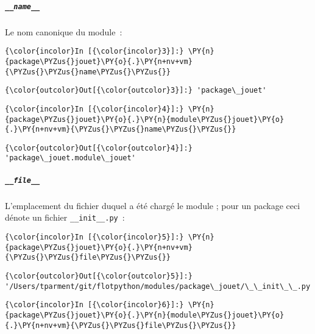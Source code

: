     \hypertarget{name__}{%
\subparagraph{\texorpdfstring{\texttt{\_\_name\_\_}}{\_\_name\_\_}}\label{name__}}

    Le nom canonique du module~:

    \begin{Verbatim}[commandchars=\\\{\}]
{\color{incolor}In [{\color{incolor}3}]:} \PY{n}{package\PYZus{}jouet}\PY{o}{.}\PY{n+nv+vm}{\PYZus{}\PYZus{}name\PYZus{}\PYZus{}}
\end{Verbatim}


\begin{Verbatim}[commandchars=\\\{\}]
{\color{outcolor}Out[{\color{outcolor}3}]:} 'package\_jouet'
\end{Verbatim}
            
    \begin{Verbatim}[commandchars=\\\{\}]
{\color{incolor}In [{\color{incolor}4}]:} \PY{n}{package\PYZus{}jouet}\PY{o}{.}\PY{n}{module\PYZus{}jouet}\PY{o}{.}\PY{n+nv+vm}{\PYZus{}\PYZus{}name\PYZus{}\PYZus{}}
\end{Verbatim}


\begin{Verbatim}[commandchars=\\\{\}]
{\color{outcolor}Out[{\color{outcolor}4}]:} 'package\_jouet.module\_jouet'
\end{Verbatim}
            
    \hypertarget{file__}{%
\subparagraph{\texorpdfstring{\texttt{\_\_file\_\_}}{\_\_file\_\_}}\label{file__}}

    L'emplacement du fichier duquel a été chargé le module ; pour un package
ceci dénote un fichier \texttt{\_\_init\_\_.py}~:

    \begin{Verbatim}[commandchars=\\\{\}]
{\color{incolor}In [{\color{incolor}5}]:} \PY{n}{package\PYZus{}jouet}\PY{o}{.}\PY{n+nv+vm}{\PYZus{}\PYZus{}file\PYZus{}\PYZus{}}
\end{Verbatim}


\begin{Verbatim}[commandchars=\\\{\}]
{\color{outcolor}Out[{\color{outcolor}5}]:} '/Users/tparment/git/flotpython/modules/package\_jouet/\_\_init\_\_.py'
\end{Verbatim}
            
    \begin{Verbatim}[commandchars=\\\{\}]
{\color{incolor}In [{\color{incolor}6}]:} \PY{n}{package\PYZus{}jouet}\PY{o}{.}\PY{n}{module\PYZus{}jouet}\PY{o}{.}\PY{n+nv+vm}{\PYZus{}\PYZus{}file\PYZus{}\PYZus{}}
\end{Verbatim}


